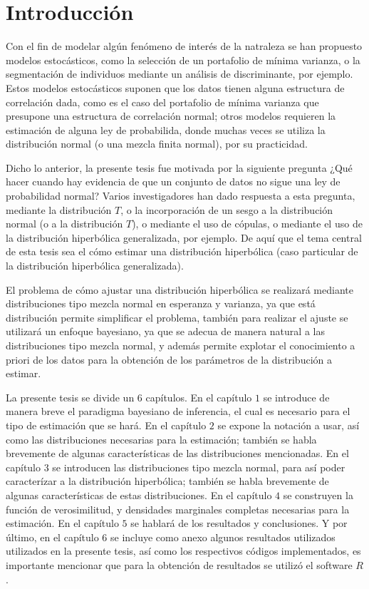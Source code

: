 \chapter{Introducción}

Con el fin de modelar algún fenómeno de interés de la natraleza se han propuesto modelos estocásticos, como la selección de un portafolio de mínima varianza, o la segmentación de individuos mediante un análisis de discriminante, por ejemplo. Estos modelos estocásticos suponen que los datos tienen alguna estructura de correlación dada, como es el caso del portafolio de mínima varianza que presupone una estructura de correlación normal; otros modelos requieren la estimación de alguna ley de probabilida, donde muchas veces se utiliza la distribución normal (o una mezcla finita normal), por su practicidad.   

Dicho lo anterior, la presente tesis fue motivada por la siguiente pregunta ¿Qué hacer cuando hay evidencia de que un conjunto de datos no sigue una ley de probabilidad normal? Varios investigadores han dado respuesta a esta pregunta, mediante la distribución $T$, o la incorporación de un sesgo a la distribución normal (o a la distribución $T$), o mediante el uso de cópulas, o mediante el uso de la distribución hiperbólica generalizada, por ejemplo. De aquí que el tema central de esta tesis sea el cómo estimar una distribución hiperbólica (caso particular de la distribución hiperbólica generalizada).

El problema de cómo ajustar una distribución hiperbólica se realizará mediante distribuciones tipo mezcla normal en esperanza y varianza, ya que está distribución permite simplificar el problema, también para realizar el ajuste se utilizará un enfoque bayesiano, ya que se adecua de manera natural a las distribuciones tipo mezcla normal, y además permite explotar el conocimiento a priori de los datos para la obtención de los parámetros de la distribución a estimar.

La presente tesis se divide un $6$ capítulos. En el capítulo $1$ se introduce de manera breve el paradigma bayesiano de inferencia, el cual es necesario para el tipo de estimación que se hará. En el capítulo $2$ se expone la notación a usar, así como las distribuciones necesarias para la estimación; también se habla brevemente de algunas características de las distribuciones mencionadas. En el capítulo $3$ se introducen las distribuciones tipo mezcla normal, para así poder caracterízar a la distribución hiperbólica; también se habla brevemente de algunas características de estas distribuciones. En el capítulo $4$ se construyen la función de verosimilitud, y densidades marginales completas necesarias para la estimación. En el capítulo $5$ se hablará de los resultados y conclusiones. Y por último, en el capítulo $6$ se incluye como anexo algunos resultados utilizados utilizados en la presente tesis, así como los respectivos códigos implementados, es importante mencionar que para la obtención de resultados se utilizó el software $R$.


 